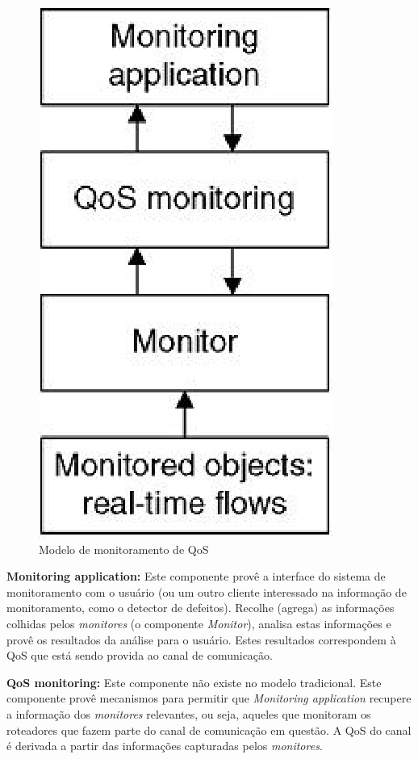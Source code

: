 \begin{figure}
\centering
\includegraphics[scale=0.7]{modelo}
\caption{Modelo de monitoramento de QoS \cite{JTK00}}
\label{fig:modelo}
\end{figure}

\textbf{Monitoring application:} Este componente provê a interface do sistema de monitoramento com o usuário (ou um outro cliente interessado na informação de monitoramento, como o detector de defeitos). Recolhe (agrega) as informações colhidas pelos \textit{monitores} (o componente \textit{Monitor}), analisa estas informações e provê os resultados da análise para o usuário. Estes resultados correspondem à QoS que está sendo provida ao canal de comunicação.

\textbf{QoS monitoring:} Este componente não existe no modelo tradicional. Este componente provê mecanismos para permitir que \textit{Monitoring application} recupere a informação dos \textit{monitores} relevantes, ou seja, aqueles que monitoram os roteadores que fazem parte do canal de comunicação em questão. A QoS do canal é derivada a partir das informações capturadas pelos \textit{monitores}.

